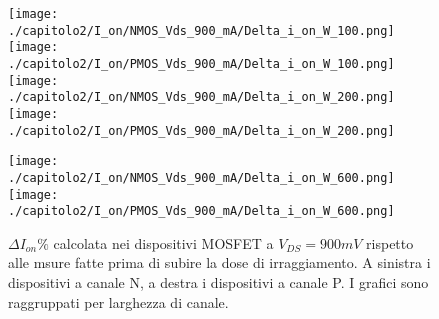 \begin{figure}[h]
    \centering
    \texttt{[image: ./capitolo2/I\_on/NMOS\_Vds\_900\_mA/Delta\_i\_on\_W\_100.png]}
    \texttt{[image: ./capitolo2/I\_on/PMOS\_Vds\_900\_mA/Delta\_i\_on\_W\_100.png]}\\
    \vspace{0.2cm}
    \texttt{[image: ./capitolo2/I\_on/NMOS\_Vds\_900\_mA/Delta\_i\_on\_W\_200.png]}
    \texttt{[image: ./capitolo2/I\_on/PMOS\_Vds\_900\_mA/Delta\_i\_on\_W\_200.png]}\\
    \vspace{0.2cm}

    \texttt{[image: ./capitolo2/I\_on/NMOS\_Vds\_900\_mA/Delta\_i\_on\_W\_600.png]}
    \texttt{[image: ./capitolo2/I\_on/PMOS\_Vds\_900\_mA/Delta\_i\_on\_W\_600.png]}

    \caption[Dati $\Delta I_{on}\%$ a $V_{DS}=440mV$ ]{$\Delta I_{on}\%$ calcolata nei dispositivi MOSFET a $V_{DS} = 900mV$ rispetto alle msure fatte prima di subire la dose di irraggiamento. A sinistra i dispositivi a canale N, a destra i dispositivi a canale P. I grafici sono raggruppati per larghezza di canale.}
    \label{fig:delta_I_on_vds_900_mv}

\end{figure}



